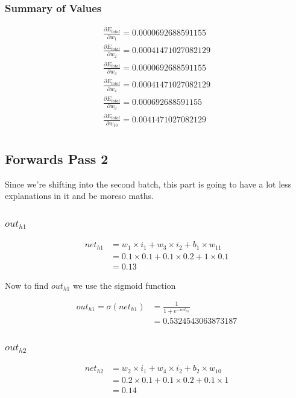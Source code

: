 \documentclass{article}
\begin{document}
\subsubsection{Summary of Values}
\begin{align*}
\frac{\partial E_{total}}{\partial w_1} = 0.0000692688591155 \\ 
\frac{\partial E_{total}}{\partial w_2} = 0.00041471027082129 \\
\frac{\partial E_{total}}{\partial w_3} = 0.0000692688591155 \\
\frac{\partial E_{total}}{\partial w_4} = 0.00041471027082129 \\
\frac{\partial E_{total}}{\partial w_9} = 0.000692688591155 \\
\frac{\partial E_{total}}{\partial w_{10}} = 0.0041471027082129 \\
\end{align*}

\subsection{Forwards Pass 2}
Since we're shifting into the second batch, this part is going to have a lot
less explanations in it and be moreso maths.
\subsubsection{$out_{h1}$}

\begin{align*}
    net_{h1} & = w_{1} \times i_1 + w_{3} \times i_{2} + b_{1} \times w_{11} \\
           & = 0.1 \times 0.1 + 0.1 \times 0.2 + 1 \times 0.1 \\
           & = 0.13
\end{align*}

Now to find $out_{h1}$ we use the sigmoid function

\begin{align*}
    out_{h1} = \sigma(net_{h1}) & = \frac{1}{1 + e^{-net_{h1}}} \\
    &= 0.5324543063873187
\end{align*}

\subsubsection{$out_{h2}$}
\begin{align*}
    net_{h2} & = w_{2} \times i_1 + w_{4} \times i_{2} + b_{2} \times w_{10} \\
    & = 0.2 \times 0.1 + 0.1 \times 0.2 + 0.1 \times 1 \\
    & = 0.14
\end{align*}
\end{document}
